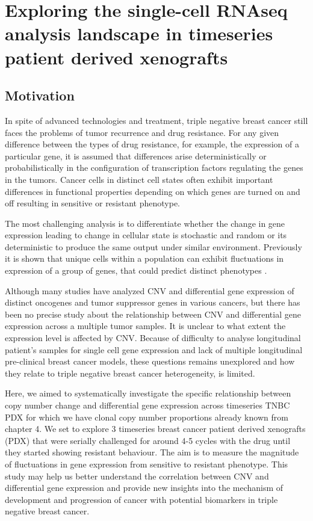 
{\chapter{Exploring the single-cell RNAseq analysis landscape in timeseries patient derived xenografts}

}
 \label{ch:Chapter5}
 \section{Motivation}

In spite of advanced technologies and treatment, triple negative breast cancer still faces the problems of tumor recurrence and drug resistance.
For any given difference between the types of drug resistance, for example, the expression of a particular gene, it is assumed that differences arise deterministically or probabilistically in the configuration of transcription factors regulating the genes in the tumors. Cancer cells in distinct cell states often exhibit important differences in functional properties depending on which genes are turned on and off resulting in sensitive or resistant phenotype.

The most challenging analysis is to differentiate whether the change in gene expression leading to change in cellular state is stochastic \cite{raj2008nature} and random or its deterministic to produce the same output under similar environment.
Previously it is shown that unique cells within a population can exhibit fluctuations in expression of a group of genes, that could predict distinct phenotypes \cite{shaffer2019memory}.

Although many studies have analyzed CNV and differential gene expression of distinct oncogenes and tumor suppressor genes in various cancers, \cite{kuzyk2015mycn, budczies2016pan, kwak2015fibroblast} but there has been no precise study about the relationship between CNV and differential gene expression across a multiple tumor samples. It is unclear to what extent the expression level is affected by CNV. Because of difficulty to analyse longitudinal patient's samples for single cell gene expression and lack of multiple longitudinal pre-clinical breast cancer models, these questions remains unexplored and how they relate to triple negative breast cancer heterogeneity, is limited.

Here, we aimed to systematically investigate the specific relationship between copy number change and differential gene expression across timeseries TNBC PDX for which we have clonal copy number proportions already known from chapter 4. We set to explore 3 timeseries breast cancer patient derived xenografts (PDX) that were serially challenged for around 4-5 cycles with the drug until they started showing resistant behaviour. The aim is to measure the magnitude of fluctuations in gene expression from sensitive to resistant phenotype.
This study may help us better understand the correlation between CNV and differential gene expression and provide new insights into the mechanism of development and progression of cancer with potential biomarkers in triple negative breast cancer.

